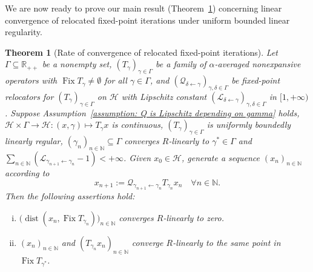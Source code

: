 \documentclass[a4paper,12pt]{article}
\newtheorem{theorem}{Theorem}[section]
\DeclareMathOperator{\Fix}{Fix}
\DeclareMathOperator{\dist}{dist}
\begin{document}
We are now ready to prove our main result (Theorem~\ref{thm: T satisfies linear error bound}) concerning linear convergence of relocated fixed-point iterations under uniform bounded linear regularity. 


\begin{theorem}[Rate of convergence of relocated fixed-point iterations]\label{thm: T satisfies linear error bound}
    Let $\Gamma\subseteq\mathbb{R}_{++}$ be a nonempty set, $(T_\gamma)_{\gamma\in\Gamma}$ be a family of $\alpha$-averaged nonexpansive operators with $\Fix{T_{\gamma}}\neq\emptyset$ for all $\gamma\in\Gamma$, and $(\mathcal{Q}_{\delta\leftarrow\gamma})_{\gamma,\delta\in\Gamma}$ be fixed-point relocators for $(T_\gamma)_{\gamma\in\Gamma}$ on $\mathcal{H}$ with Lipschitz constant $(\mathcal{L_{\delta\leftarrow\gamma}})_{\gamma,\delta\in\Gamma}$ in $[1,+\infty)$. Suppose Assumption~\ref{assumption: Q is Lipschitz depending on gamma} holds, $\mathcal{H}\times \Gamma\to \mathcal{H}\colon (x,\gamma)\mapsto T_{\gamma}x$ is continuous, $(T_\gamma)_{\gamma\in\Gamma}$ is uniformly boundedly linearly  regular, $(\gamma_n)_{n\in\mathbb{N}}\subseteq\Gamma$ converges $R$-linearly to $\gamma^*\in\Gamma$ and $\sum_{n\in\mathbb{N}}(\mathcal{L}_{\gamma_{n+1}\leftarrow\gamma_n}-1)<+\infty$.
    Given $x_0\in\mathcal{H}$, generate a sequence $(x_n)_{n\in\mathbb{N}}$ according to
    \begin{equation}\label{eq-NDR:iteration for fixed-point relocator-error-bound}
x_{n+1}:=\mathcal{Q}_{\gamma_{n+1}\leftarrow\gamma_n}T_{\gamma_{n}}x_n \quad \forall n\in\mathbb{N}.
    \end{equation}
    Then the following assertions hold:
    \begin{enumerate}[(i)]
    \item \label{it i}$\big(\dist(x_n,\Fix T_{\gamma_n})\big)_{n \in \mathbb{N}}$ converges $R$-linearly to zero.
    \item\label{it ii:T satisfies linear error bound}$(x_n)_{n\in\mathbb{N}}$ and $(T_{\gamma_n}x_n)_{n\in\mathbb{N}}$ converge $R$-linearly to the same point in $\Fix T_{\gamma^*}$.
    \end{enumerate}
\end{theorem}
\end{document}
